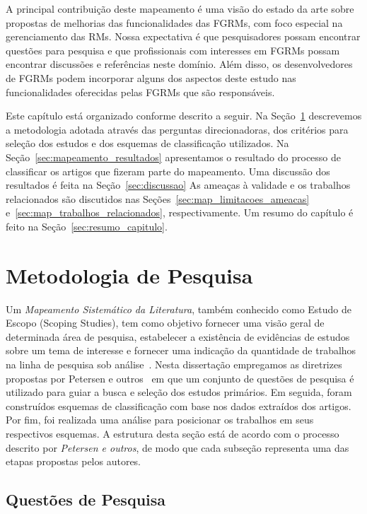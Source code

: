 A principal contribuição deste mapeamento é uma visão do estado da arte sobre
propostas de melhorias das funcionalidades das FGRMs, com foco especial na
gerenciamento das RMs. Nossa expectativa é que pesquisadores possam encontrar
questões para pesquisa e que profissionais com interesses em FGRMs possam
encontrar discussões e referências neste domínio. Além disso, os desenvolvedores
de FGRMs podem incorporar alguns dos aspectos deste estudo nas funcionalidades
oferecidas pelas FGRMs que são responsáveis.

Este capítulo está organizado conforme descrito a seguir. Na
Seção~\ref{sec:map-metodologia} descrevemos a metodologia adotada através das
perguntas direcionadoras, dos critérios para seleção dos estudos e dos esquemas
de classificação utilizados. Na Seção~\ref{sec:mapeamento_resultados}
apresentamos o resultado do processo de classificar os artigos que fizeram parte
do mapeamento. Uma discussão dos resultados é feita na Seção~\ref{sec:discussao}
As ameaças à validade e os trabalhos relacionados são discutidos nas
Seções~\ref{sec:map_limitacoes_ameacas} e~\ref{sec:map_trabalhos_relacionados},
respectivamente. Um resumo do capítulo é feito na
Seção~\ref{sec:resumo_capitulo}.

\section{Metodologia de Pesquisa}
\label{sec:map-metodologia}

Um \textit{Mapeamento Sistemático da Literatura}, também conhecido como Estudo
de Escopo (Scoping Studies), tem como objetivo fornecer uma visão geral de
determinada área de pesquisa, estabelecer a existência de evidências de estudos
sobre um tema de interesse e fornecer uma indicação da quantidade de trabalhos
na linha de pesquisa sob
análise~\cite{keele2007guidelines,wohlin2012experimentation}. Nesta dissertação
empregamos as diretrizes propostas por Petersen e outros~\cite{Petersen2008} em
que um conjunto de questões de pesquisa é utilizado para guiar a busca e seleção
dos estudos primários. Em seguida, foram construídos esquemas de classificação
com base nos dados extraídos dos artigos. Por fim, foi realizada uma análise
para posicionar os trabalhos em seus respectivos esquemas. A estrutura desta
seção está de acordo com o processo descrito por \textit{Petersen e outros}, de
modo que cada subseção representa uma das etapas propostas pelos autores.

\subsection{Questões de Pesquisa}
\label{subsec:map-questoes-de-pesquisa}

